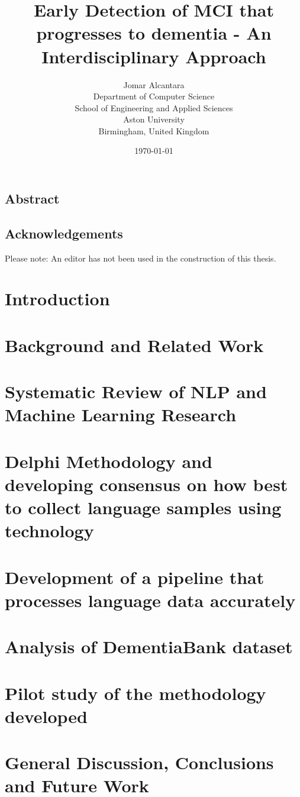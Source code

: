 \documentclass[10pt, letterpaper, twoside, openany]{book}
\title{Early Detection of MCI that progresses to dementia - An Interdisciplinary Approach}
\author{
        Jomar Alcantara \\
        Department of Computer Science \\
        School of Engineering and Applied Sciences \\
        Aston University\\
        Birmingham, United Kingdom
}
\date{\today}
\begin{document}
\maketitle
\newpage
\section*{Abstract}
\newpage
\section*{Acknowledgements}
Please note: An editor has not been used in the construction of this thesis.
\newpage
\tableofcontents
\newpage
\listoffigures
\listoftables

\chapter{Introduction}


\chapter{Background and Related Work}


\chapter{Systematic Review of NLP and Machine Learning Research}


\chapter{Delphi Methodology and developing consensus on how best to collect language samples using technology}


\chapter{Development of a pipeline that processes language data accurately}


\chapter{Analysis of DementiaBank dataset}


\chapter{Pilot study of the methodology developed}


\chapter{General Discussion, Conclusions and Future Work}




\end{document}

